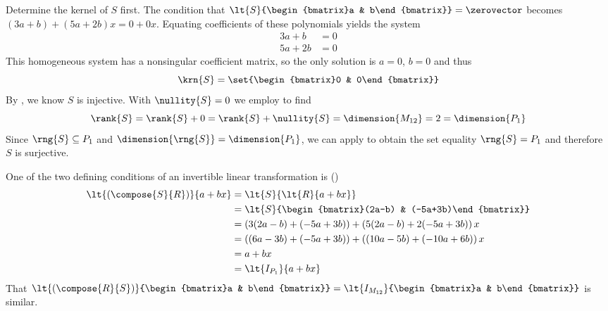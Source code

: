 Determine the kernel of $S$ first.  The condition that $\lt{S}{\begin{bmatrix}a & b\end{bmatrix}}=\zerovector$ becomes $(3a+b)+(5a+2b)x=0+0x$.  Equating coefficients of these polynomials yields the system
%
\begin{align*}
3a+b&=0\\
5a+2b&=0
\end{align*}
%
This homogeneous system has a nonsingular coefficient matrix, so the only solution is $a=0$, $b=0$ and thus
%
\begin{equation*}
\krn{S}=\set{\begin{bmatrix}0 & 0\end{bmatrix}}
\end{equation*}
%
By , we know $S$ is injective.  With $\nullity{S}=0$ we employ  to find
%
\begin{equation*}
\rank{S}=\rank{S}+0=\rank{S}+\nullity{S}=\dimension{M_{12}}=2=\dimension{P_1}
\end{equation*}
%
Since $\rng{S}\subseteq P_1$ and $\dimension{\rng{S}}=\dimension{P_1}$, we can apply  to obtain the set equality $\rng{S}=P_1$ and therefore $S$ is surjective. \par
%
One of the two defining conditions of an invertible linear transformation is ()
%
\begin{align*}
\lt{\left(\compose{S}{R}\right)}{a+bx}&=\lt{S}{\lt{R}{a+bx}}\\
&=\lt{S}{\begin{bmatrix}(2a-b) & (-5a+3b)\end{bmatrix}}\\
&=\left(3(2a-b)+(-5a+3b)\right)+\left(5(2a-b)+2(-5a+3b)\right)x\\
&=\left((6a-3b)+(-5a+3b)\right)+\left((10a-5b)+(-10a+6b)\right)x\\
&=a+bx\\
&=\lt{I_{P_1}}{a+bx}
\end{align*}
%
That 
$\lt{\left(\compose{R}{S}\right)}{\begin{bmatrix}a & b\end{bmatrix}}=
\lt{I_{M_{12}}}{\begin{bmatrix}a & b\end{bmatrix}}$
is similar.
